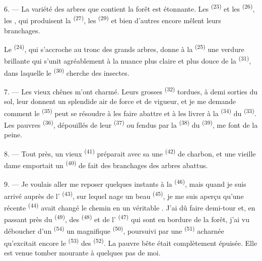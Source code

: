 6. --- La variété des arbres que contient la forêt est étonnante. Les
 \textsuperscript{(23)} et les 
\textsuperscript{(26)}, les , qui produisent la 
\textsuperscript{(27)}, les  \textsuperscript{(29)} et bien
d'autres encore mêlent leurs branchages.

Le  \textsuperscript{(24)}, qui s'accroche au tronc des grands
arbres, donne à la  \textsuperscript{(25)} une verdure brillante
qui s'unit agréablement à la nuance plus claire et plus douce de la
 \textsuperscript{(31)}, dans laquelle le 
\textsuperscript{(30)} cherche des insectes.

\VUsaut{3.0mm}
\VUsaut{3.0mm}

7. --- Les vieux chênes m'ont charmé. Leurs grosses 
\textsuperscript{(32)} tordues, à demi sorties du sol, leur donnent un
splendide air de force et de vigueur, et je me demande comment le
 \textsuperscript{(35)} peut se résoudre à les faire
abattre et à les livrer à la  \textsuperscript{(34)} du
 \textsuperscript{(33)}. Les pauvres 
\textsuperscript{(36)}, dépouillés de leur 
\textsuperscript{(37)} ou fendus par la  \textsuperscript{(38)}
du  \textsuperscript{(39)}, me font de la peine.

8. --- Tout près, un vieux  \textsuperscript{(41)}
préparait avec sa  une  \textsuperscript{(42)} de
charbon, et une vieille dame emportait un  \textsuperscript{(40)}
de  fait des branchages des arbres abattus.

\VUsaut{3.0mm}
\VUsaut{3.0mm}

9. --- Je voulais aller me reposer quelques instants à la  \textsuperscript{(46)}, mais quand je suis arrivé auprès de
l' \textsuperscript{(43)}, sur lequel nage un beau 
\textsuperscript{(45)}, je me suis aperçu qu'une récente 
\textsuperscript{(44)} avait changé le chemin en un véritable
. J'ai dû faire demi-tour et, en passant près du
 \textsuperscript{(49)}, des 
\textsuperscript{(48)} et de l' \textsuperscript{(47)} qui sont en
bordure de la forêt, j'ai vu déboucher d'un 
\textsuperscript{(54)} un magnifique  \textsuperscript{(50)},
poursuivi par une  \textsuperscript{(51)} acharnée qu'excitait
encore le  \textsuperscript{(53)} des 
\textsuperscript{(52)}. La pauvre bête était complètement épuisée. Elle est
venue tomber mourante à quelques pas de moi.

